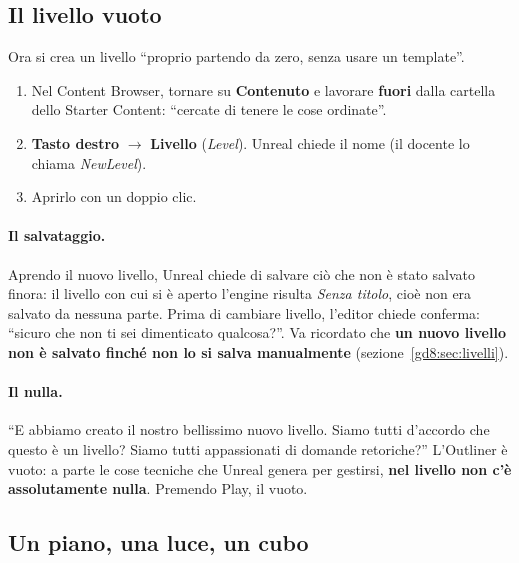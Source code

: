 \subsection{Il livello vuoto}

Ora si crea un livello ``proprio partendo da zero, senza usare un template''.
\begin{enumerate}
  \item Nel Content Browser, tornare su \textbf{Contenuto} e lavorare
        \textbf{fuori} dalla cartella dello Starter Content: ``cercate di
        tenere le cose ordinate''.
  \item \textbf{Tasto destro} $\rightarrow$ \textbf{Livello} (\emph{Level}).
        Unreal chiede il nome (il docente lo chiama \emph{NewLevel}).
  \item Aprirlo con un doppio clic.
\end{enumerate}

\paragraph{Il salvataggio.} Aprendo il nuovo livello, Unreal chiede di salvare
ciò che non è stato salvato finora: il livello con cui si è aperto l'engine
risulta \emph{Senza titolo}, cioè non era salvato da nessuna parte. Prima di
cambiare livello, l'editor chiede conferma: ``sicuro che non ti sei dimenticato
qualcosa?''. Va ricordato che \textbf{un nuovo livello non è salvato finché non
lo si salva manualmente} (sezione~\ref{gd8:sec:livelli}).

\paragraph{Il nulla.} ``E abbiamo creato il nostro bellissimo nuovo livello.
Siamo tutti d'accordo che questo è un livello? Siamo tutti appassionati di
domande retoriche?'' L'Outliner è vuoto: a parte le cose tecniche che Unreal
genera per gestirsi, \textbf{nel livello non c'è assolutamente nulla}. Premendo
Play, il vuoto.

\subsection{Un piano, una luce, un cubo}

